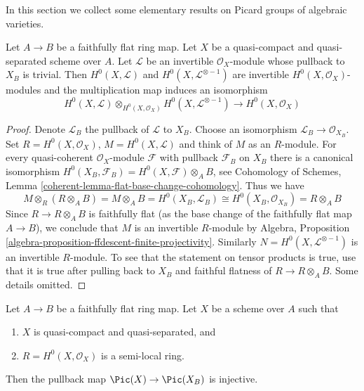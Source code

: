 \noindent
In this section we collect some elementary results on Picard groups
of algebraic varieties.

\begin{lemma}
\label{lemma-change-rings-pic-pre}
Let $A \to B$ be a faithfully flat ring map. Let $X$ be a quasi-compact and
quasi-separated scheme over $A$. Let $\mathcal{L}$ be an invertible
$\mathcal{O}_X$-module whose pullback to $X_B$ is trivial. Then
$H^0(X, \mathcal{L})$ and $H^0(X, \mathcal{L}^{\otimes -1})$ are invertible
$H^0(X, \mathcal{O}_X)$-modules and the
multiplication map induces an isomorphism
$$
H^0(X, \mathcal{L}) \otimes_{H^0(X, \mathcal{O}_X)}
H^0(X, \mathcal{L}^{\otimes -1}) \longrightarrow
H^0(X, \mathcal{O}_X)
$$
\end{lemma}

\begin{proof}
Denote $\mathcal{L}_B$ the pullback of $\mathcal{L}$ to $X_B$.
Choose an isomorphism $\mathcal{L}_B \to \mathcal{O}_{X_B}$.
Set $R = H^0(X, \mathcal{O}_X)$, $M = H^0(X, \mathcal{L})$ and think of
$M$ as an $R$-module. For every quasi-coherent $\mathcal{O}_X$-module
$\mathcal{F}$ with pullback $\mathcal{F}_B$ on $X_B$ there is a
canonical isomorphism
$H^0(X_B, \mathcal{F}_B) = H^0(X, \mathcal{F}) \otimes_A B$, see
Cohomology of Schemes, Lemma \ref{coherent-lemma-flat-base-change-cohomology}.
Thus we have
$$
M \otimes_R (R \otimes_A B) =
M \otimes_A B = H^0(X_B, \mathcal{L}_B) \cong
H^0(X_B, \mathcal{O}_{X_B}) = R \otimes_A B
$$
Since $R \to R \otimes_A B$ is faithfully flat (as the base change
of the faithfully flat map $A \to B$), we conclude
that $M$ is an invertible $R$-module by
Algebra, Proposition \ref{algebra-proposition-ffdescent-finite-projectivity}.
Similarly $N = H^0(X, \mathcal{L}^{\otimes -1})$ is an invertible $R$-module.
To see that the statement on tensor products is true, use that it is true
after pulling back to $X_B$ and faithful flatness of $R \to R \otimes_A B$.
Some details omitted.
\end{proof}

\begin{lemma}
\label{lemma-change-rings-pic}
Let $A \to B$ be a faithfully flat ring map.
Let $X$ be a scheme over $A$ such that
\begin{enumerate}
\item $X$ is quasi-compact and quasi-separated, and
\item $R = H^0(X, \mathcal{O}_X)$ is a semi-local ring.
\end{enumerate}
Then the pullback map $\Pic(X) \to \Pic(X_B)$ is injective.
\end{lemma}

